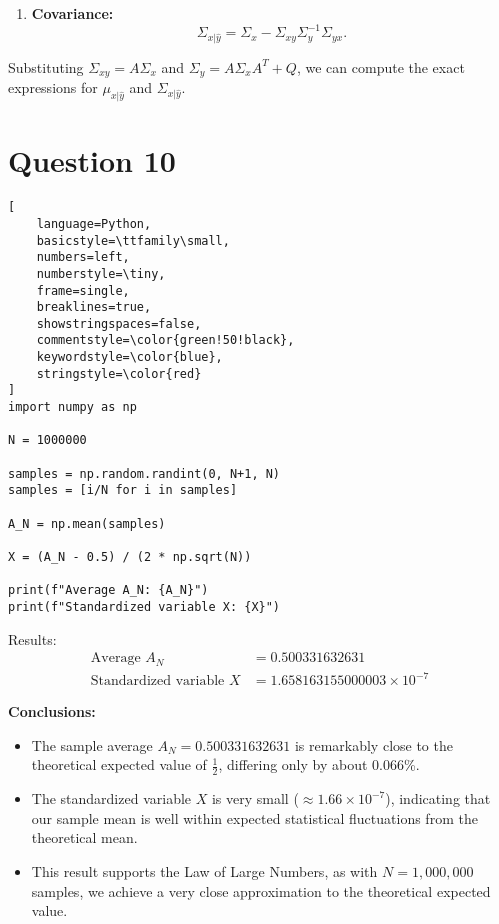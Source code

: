 \documentclass[12pt]{article}
\begin{document}
\begin{itemize}
\begin{enumerate}
    \item \textbf{Covariance:}
    \[
    \Sigma_{x|\hat{y}} = \Sigma_x - \Sigma_{xy}\Sigma_y^{-1}\Sigma_{yx}.
    \]
\end{enumerate}

Substituting \( \Sigma_{xy} = A\Sigma_x \) and \( \Sigma_y = A\Sigma_xA^T + Q \), we can compute the exact expressions for \( \mu_{x|\hat{y}} \) and \( \Sigma_{x|\hat{y}} \).







\section*{Question 10}
\begin{lstlisting}[
    language=Python,
    basicstyle=\ttfamily\small,
    numbers=left,
    numberstyle=\tiny,
    frame=single,
    breaklines=true,
    showstringspaces=false,
    commentstyle=\color{green!50!black},
    keywordstyle=\color{blue},
    stringstyle=\color{red}
]
import numpy as np

N = 1000000

samples = np.random.randint(0, N+1, N)
samples = [i/N for i in samples]

A_N = np.mean(samples)

X = (A_N - 0.5) / (2 * np.sqrt(N))

print(f"Average A_N: {A_N}")
print(f"Standardized variable X: {X}")
\end{lstlisting}

\medskip
\noindent Results:
\begin{align*}
    \text{Average } A_N &= 0.500331632631 \\
    \text{Standardized variable } X &= 1.658163155000003 \times 10^{-7}
\end{align*}

\medskip
\noindent \textbf{Conclusions:}
\begin{itemize}
    \item The sample average $A_N = 0.500331632631$ is remarkably close to the theoretical expected value of $\frac{1}{2}$, differing only by about 0.066\%.
    
    \item The standardized variable $X$ is very small ($\approx 1.66 \times 10^{-7}$), indicating that our sample mean is well within expected statistical fluctuations from the theoretical mean.
    
    \item This result supports the Law of Large Numbers, as with $N = 1,000,000$ samples, we achieve a very close approximation to the theoretical expected value.
    

\end{itemize}
\end{itemize}
\end{document}
